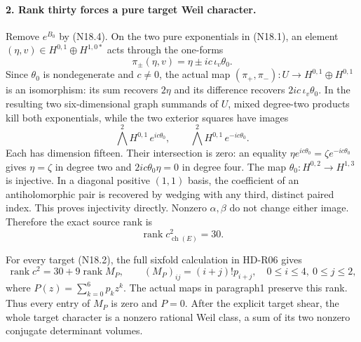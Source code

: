 \paragraph{2. Rank thirty forces a pure target Weil character.}
Remove $e^{B_0}$ by (N18.4). On the two pure exponentials in
(N18.1), an element $(\eta,v)\in
H^{0,1}\oplus H^{1,0*}$ acts through the one-forms
\[
              \pi_\pm(\eta,v)=\eta\pm ic\,\iota_v\theta_0.
\]
Since $\theta_0$ is nondegenerate and $c\ne0$, the actual
map $(\pi_+,\pi_-):U\to H^{0,1}\oplus H^{0,1}$ is an
isomorphism: its sum recovers $2\eta$ and its difference
recovers $2ic\,\iota_v\theta_0$. In the resulting two
six-dimensional graph summands of $U$, mixed degree-two
products kill both exponentials, while the two exterior
squares have images
\[
        \bigwedge^2H^{0,1}\,e^{ic\theta_0},
             \qquad \bigwedge^2H^{0,1}\,e^{-ic\theta_0}.
\]
Each has dimension fifteen. Their intersection is zero:
an equality $\eta e^{ic\theta_0}=\zeta e^{-ic\theta_0}$
gives $\eta=\zeta$ in degree two and
$2ic\theta_0\eta=0$ in degree four. The map
$\theta_0:H^{0,2}\to H^{1,3}$ is injective. In a diagonal
positive $(1,1)$ basis, the coefficient of an antiholomorphic
pair is recovered by wedging with any third, distinct paired
index. This proves injectivity directly. Nonzero $\alpha,\beta$
do not change either image. Therefore the exact source rank is
\begin{equation}
              \operatorname{rank}c^2_{\operatorname{ch}(E)}=30.
                                                        \tag{N18.6}
\end{equation}

For every target (N18.2), the full sixfold calculation in
HD-R06 gives
\[
 \operatorname{rank}c^2=30+9\operatorname{rank}M_P,
 \qquad (M_P)_{ij}=(i+j)!p_{i+j},\quad
                 0\le i\le4,\ 0\le j\le2,
\]
where $P(z)=\sum_{k=0}^6p_kz^k$.
The actual maps in paragraph1 preserve this rank. Thus every
entry of $M_P$ is zero and $P=0$. After the explicit target
shear, the whole target character is a nonzero rational Weil
class, a sum of its two nonzero conjugate determinant volumes.

